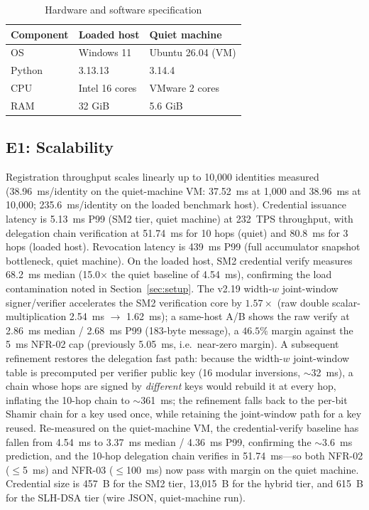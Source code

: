 \documentclass[10pt,twocolumn]{IEEEtran}
\begin{document}
\begin{table}[t]
  \caption{Hardware and software specification}
  \label{tab:setup}
  \centering\small\setlength{\tabcolsep}{3pt}
  \begin{tabular}{lll}
    \toprule
    \textbf{Component} & \textbf{Loaded host} & \textbf{Quiet machine} \\
    \midrule
    OS & Windows 11 & Ubuntu 26.04 (VM) \\
    Python & 3.13.13 & 3.14.4 \\
    CPU & Intel 16 cores & VMware 2 cores \\
    RAM & 32 GiB & 5.6 GiB \\
    \bottomrule
  \end{tabular}
\end{table}

\subsection{E1: Scalability}

Registration throughput scales linearly up to 10,000 identities measured
(38.96~ms/identity on the quiet-machine VM: 37.52~ms at 1,000 and
38.96~ms at 10,000; 235.6~ms/identity on the loaded
benchmark host). Credential issuance latency is 5.13~ms P99 (SM2 tier,
quiet machine) at 232~TPS throughput, with delegation chain verification at 51.74~ms for 10 hops
(quiet) and 80.8~ms for 3 hops (loaded host). Revocation latency is
439~ms P99 (full accumulator snapshot bottleneck, quiet machine).
On the loaded host, SM2 credential verify measures 68.2~ms median
(15.0$\times$ the quiet baseline of 4.54~ms), confirming the
load contamination noted in Section~\ref{sec:setup}. The v2.19 width-$w$
joint-window signer/verifier accelerates the SM2 verification core
by $1.57\times$ (raw double scalar-multiplication 2.54~ms
$\rightarrow$ 1.62~ms); a same-host A/B shows the raw verify at
2.86~ms median / 2.68~ms P99 (183-byte message), a $46.5\%$ margin
against the 5~ms NFR-02 cap (previously 5.05~ms, i.e.\ near-zero
margin). A subsequent refinement restores the delegation fast path:
because the width-$w$ joint-window table is precomputed per verifier
public key (16 modular inversions, $\sim$32~ms), a chain whose hops
are signed by \emph{different} keys would rebuild it at every hop,
inflating the 10-hop chain to $\sim$361~ms; the refinement falls back
to the per-bit Shamir chain for a key used once, while retaining the
joint-window path for a key reused. Re-measured on the
quiet-machine VM, the credential-verify baseline has fallen from
4.54~ms to 3.37~ms median / 4.36~ms P99, confirming the
$\sim$3.6~ms prediction, and the 10-hop delegation chain verifies
in 51.74~ms---so both NFR-02 ($\le$5~ms) and NFR-03 ($\le$100~ms)
now pass with margin on the quiet machine.
Credential size is 457~B for
the SM2 tier, 13,015~B for the hybrid tier, and 615~B for the SLH-DSA
tier (wire JSON, quiet-machine run).
\end{document}
